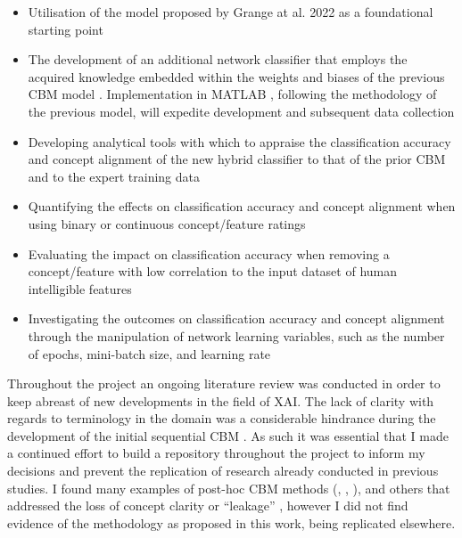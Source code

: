 \begin{itemize}
\item Utilisation of the model proposed by Grange at al. 2022 \cite{grangeXAISelfexplanatoryAI2022} as a foundational starting point

\item The development of an additional network classifier that employs the acquired knowledge embedded within the weights and biases of the previous CBM model \cite{grangeXAISelfexplanatoryAI2022}. Implementation in MATLAB \cite{MATLAB}, following the methodology of the previous model, will expedite development and subsequent data collection

\item Developing analytical tools with which to appraise the classification accuracy and concept alignment of the new hybrid classifier to that of the prior CBM and to the expert training data

\item Quantifying the effects on classification accuracy and concept alignment when using binary or continuous concept/feature ratings

\item Evaluating the impact on classification accuracy when removing a concept/feature with low correlation to the input dataset of human intelligible features

\item Investigating the outcomes on classification accuracy and concept alignment through the manipulation of network learning variables, such as the number of epochs, mini-batch size, and learning rate

\end{itemize}

Throughout the project an ongoing literature review was conducted in order to keep abreast of new developments in the field of XAI. The lack of clarity with regards to terminology in the domain was a considerable hindrance during the development of the initial sequential CBM \cite{grangeXAISelfexplanatoryAI2022}. As such it was essential that I made a continued effort to build a repository throughout the project to inform my decisions and prevent the replication of research already conducted in previous studies. I found many examples of post-hoc CBM methods (\cite{havasiAddressingLeakageConcept2022a}, \cite{yuksekgonulPosthocConceptBottleneck2022}, \cite{daneshjouSkinConSkinDisease2022}), and others that addressed the loss of concept clarity or “leakage” \cite{mahinpeiPromisesPitfallsBlackBox2021}, however I did not find evidence of the methodology as proposed in this work, being replicated elsewhere.

